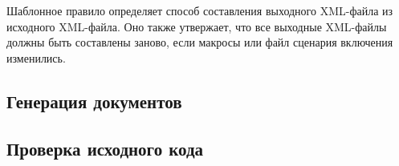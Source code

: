 Шаблонное правило определяет способ составления выходного XML-файла из
исходного XML-файла. Оно также утвержает, что все выходные XML-файлы
должны быть составлены заново, если макросы или файл сценария
включения изменились.

\subsection{Генерация документов}

\subsection{Проверка исходного кода}
